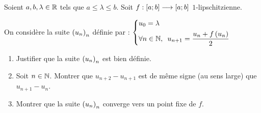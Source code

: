 \begin{corr}
\end{corr}

\begin{exo}[Exercice 23]
Soient \(a,b,\lambda\in\mathbb{R}\) tels que \(a\leq\lambda\leq b\). Soit \(f:\left[a;b\right]\longrightarrow\left[a;b\right]\) \(1\)-lipschitzienne.

On considère la suite \(\left(u_n\right)_n\) définie par : \(\begin{dcases}u_0=\lambda \\ \quantifs{\forall n\in\N}u_{n+1}=\dfrac{u_n+f\paren{u_n}}{2}\end{dcases}\)

\begin{enumerate}
\item Justifier que la suite \(\left(u_n\right)_n\) est bien définie. \\

\item Soit \(n\in\mathbb{N}\). Montrer que \(u_{n+2}-u_{n+1}\) est de même signe (au sens large) que \(u_{n+1}-u_n\). \\

\item Montrer que la suite \(\left(u_n\right)_n\) converge vers un point fixe de \(f\).
\end{enumerate}
\end{exo}

\begin{corr}
\end{corr}